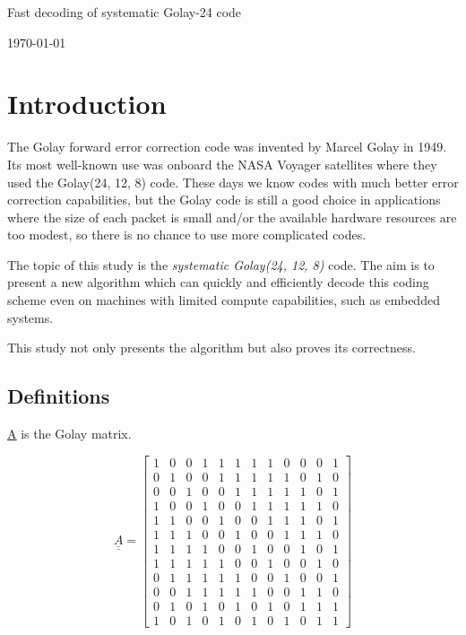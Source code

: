 \documentclass[11pt,a4paper,oneside]{report}             %
\def\doubleunderline#1{\underline{\underline{#1}}}
\begin{document}
\begin{titlepage}
\begin{center}
{\huge Fast decoding of systematic Golay-24 code } 
\vspace{0.5cm}

\vfill
{\large \today}
\end{center}
\end{titlepage}

\chapter{Introduction}

The Golay forward error correction code was invented by Marcel Golay in 1949. Its most well-known
use was onboard the NASA Voyager satellites where they used the Golay(24, 12, 8) code. These days
we know codes with much better error correction capabilities, but the Golay code is still a good
choice in applications where the size of each packet is small and/or the available hardware
resources are too modest, so there is no chance to use more complicated codes.

The topic of this study is the \emph{systematic Golay(24, 12, 8)} code. The aim is to present a
new algorithm which can quickly and efficiently decode this coding scheme even on machines with
limited compute capabilities, such as embedded systems.

This study not only presents the algorithm but also proves its correctness.

\section{Definitions}

\doubleunderline{A} is the Golay matrix.

\[
    \doubleunderline{A} = 
    \begin{bmatrix}
            1 & 0 & 0 & 1 & 1 & 1 & 1 & 1 & 0 & 0 & 0 & 1 \\
            0 & 1 & 0 & 0 & 1 & 1 & 1 & 1 & 1 & 0 & 1 & 0 \\
            0 & 0 & 1 & 0 & 0 & 1 & 1 & 1 & 1 & 1 & 0 & 1 \\
            1 & 0 & 0 & 1 & 0 & 0 & 1 & 1 & 1 & 1 & 1 & 0 \\
            1 & 1 & 0 & 0 & 1 & 0 & 0 & 1 & 1 & 1 & 0 & 1 \\
            1 & 1 & 1 & 0 & 0 & 1 & 0 & 0 & 1 & 1 & 1 & 0 \\
            1 & 1 & 1 & 1 & 0 & 0 & 1 & 0 & 0 & 1 & 0 & 1 \\
            1 & 1 & 1 & 1 & 1 & 0 & 0 & 1 & 0 & 0 & 1 & 0 \\
            0 & 1 & 1 & 1 & 1 & 1 & 0 & 0 & 1 & 0 & 0 & 1 \\
            0 & 0 & 1 & 1 & 1 & 1 & 1 & 0 & 0 & 1 & 1 & 0 \\
            0 & 1 & 0 & 1 & 0 & 1 & 0 & 1 & 0 & 1 & 1 & 1 \\
            1 & 0 & 1 & 0 & 1 & 0 & 1 & 0 & 1 & 0 & 1 & 1
    \end{bmatrix}
\]
\end{document}
